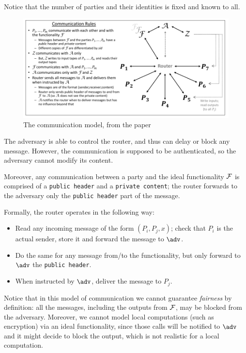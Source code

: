 Notice that the number of parties and their identities is fixed and known to all.

\begin{figure}
    \includegraphics[scale=0.9]{router}
    \caption{The communication model, from the \cite{Canetti_SUC} paper}
    \label{SUC_router}
\end{figure}

The adversary is able to control the router, and thus can delay or block any message. However, the communication is supposed to be authenticated, so the adversary cannot modify its content.

Moreover, any communication between a party and the ideal functionality $\mathcal{F}$ is comprised of a \texttt{public header} and a \texttt{private content}; the router forwards to the adversary only the \texttt{public header} part of the message.

Formally, the router operates in the following way:
\begin{itemize}
    \item Read any incoming message of the form $(P_i,P_j,x)$; check that $P_i$ is the actual sender, store it and forward the message to $\adv$.
    \item Do the same for any message from/to the functionality, but only forward to $\adv$ the \texttt{public header}.
    \item When instructed by $\adv$, deliver the message to $P_j$.
\end{itemize}

Notice that in this model of communication we cannot guarantee \emph{fairness} by definition: all the messages, including the outputs from $\mathcal{F}$, may be blocked from the adversary. Moreover, we cannot model local computations (such as encryption) via an ideal functionality, since those calls will be notified to $\adv$ and it might decide to block the output, which is not realistic for a local computation.

